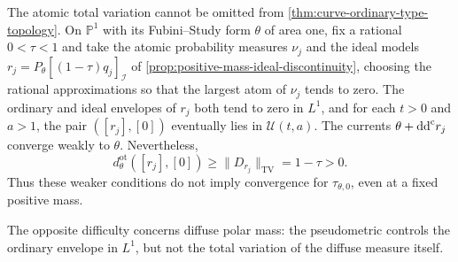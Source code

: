 The atomic total variation cannot be omitted from \cref{thm:curve-ordinary-type-topology}. On $\mathbb P^1$ with its Fubini--Study form $\theta$ of area one, fix a rational $0<\tau<1$ and take the atomic probability measures $\nu_j$ and the ideal models $r_j=P_\theta[(1-\tau)q_j]_{\mathcal I}$ of \cref{prop:positive-mass-ideal-discontinuity}, choosing the rational approximations so that the largest atom of $\nu_j$ tends to zero. The ordinary and ideal envelopes of $r_j$ both tend to zero in $L^1$, and for each $t>0$ and $a>1$, the pair $([r_j],[0])$ eventually lies in $\mathcal U(t,a)$. The currents $\theta+\mathrm{dd}^{\mathrm{c}} r_j$ converge weakly to $\theta$. Nevertheless,
\[
 d^{\mathrm{ot}}_\theta([r_j],[0])
 \geq\|D_{r_j}\|_{\mathrm{TV}}=1-\tau>0.
\]
Thus these weaker conditions do not imply convergence for $\tau_{\theta,0}$, even at a fixed positive mass.

The opposite difficulty concerns diffuse polar mass: the pseudometric controls the ordinary envelope in $L^1$, but not the total variation of the diffuse measure itself.

